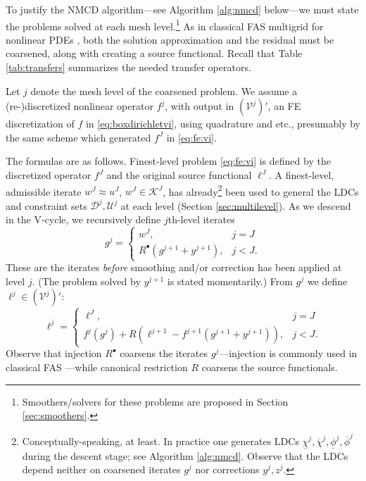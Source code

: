 \documentclass[letterpaper,final,12pt,reqno]{amsart}
\theoremstyle{cstyle}
\theoremstyle{cstyle*}
\theoremstyle{dstyle}
\numberwithin{equation}{section}
\numberwithin{figure}{section}
\numberwithin{table}{section}
\numberwithin{theorem}{section}
\newcommand{\cV}{\mathcal{V}}
\newcommand{\iR}{R^{\bullet}}
\begin{document}
To justify the NMCD algorithm---see Algorithm \ref{alg:nmcd} below---we must state the problems solved at each mesh level.\footnote{Smoothers/solvers for these problems are proposed in Section \ref{sec:smoothers}.}  As in classical FAS multigrid for nonlinear PDEs \cite{BrandtLivne2011,Bruneetal2015,Trottenbergetal2001}, both the solution approximation and the residual must be coarsened, along with creating a source functional.  Recall that Table \ref{tab:transfers} summarizes the needed transfer operators.

Let $j$ denote the mesh level of the coarsened problem.  We assume a (re-)discretized nonlinear operator $f^j$, with output in $(\cV^j)'$, an FE discretization of $f$ in \eqref{eq:boxdirichletvi}, using quadrature and etc., presumably by the same scheme which generated $f^J$ in \eqref{eq:fe:vi}.

The formulas are as follows.  Finest-level problem \eqref{eq:fe:vi} is defined by the discretized operator $f^J$ and the original source functional $\ell^J$.  A finest-level, admissible iterate $w^J \approx u^J$, $w^J \in \mathcal{K}^J$, has already\footnote{Conceptually-speaking, at least.  In practice one generates LDCs $\underline{\chi}^j,\overline{\chi}^j,\underline{\phi}^j,\overline{\phi}^j$ during the descent stage; see Algorithm \ref{alg:nmcd}.  Observe that the LDCs depend neither on coarsened iterates $g^j$ nor corrections $y^j,z^j$.} been used to general the LDCs and constraint sets $\mathcal{D}^j,\mathcal{U}^j$ at each level (Section \ref{sec:multilevel}).  As we descend in the V-cycle, we recursively define $j$th-level iterates
\begin{equation}
g^j = \begin{cases} w^J, & j=J \\
                    \iR(g^{j+1} + y^{j+1}), & j < J.
      \end{cases}  \label{eq:fe:defineg}
\end{equation}
These are the iterates \emph{before} smoothing and/or correction has been applied at level $j$.  (The problem solved by $y^{j+1}$ is stated momentarily.)  From $g^j$ we define $\ell^j \in (\cV^j)'$:
\begin{equation}
\ell^j = \begin{cases} \ell^J, & j=J \\
                       f^j(g^j) + R\left(\ell^{j+1}-f^{j+1}(g^{j+1}+y^{j+1})\right), & j<J. \end{cases} \label{eq:fe:levelsource}
\end{equation}
Observe that injection $\iR$ coarsens the iterates $g^j$---injection is commonly used in classical FAS \cite[section 5.3]{Trottenbergetal2001}---while canonical restriction $R$ coarsens the source functionals.
\end{document}
